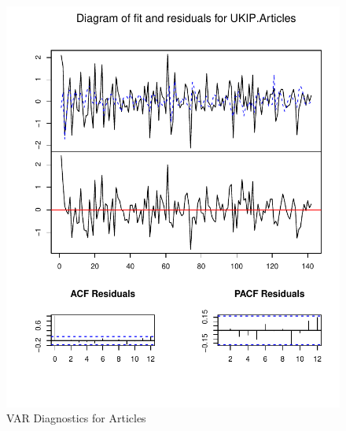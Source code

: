 \documentclass[12pt,]{article}
\makeatletter
\def\maxwidth{\ifdim\Gin@nat@width>\linewidth\linewidth
\else\Gin@nat@width\fi}
\let\Oldincludegraphics\includegraphics
\renewcommand{\includegraphics}[1]{\Oldincludegraphics[width=\maxwidth]{#1}}
\makeatother
\begin{document}
\pagebreak

\begin{figure}[htbp]
\centering
\includegraphics{ukip_media_files/var-plot-articles.pdf}
\caption{VAR Diagnostics for Articles}
\end{figure}

\pagebreak
\end{document}
